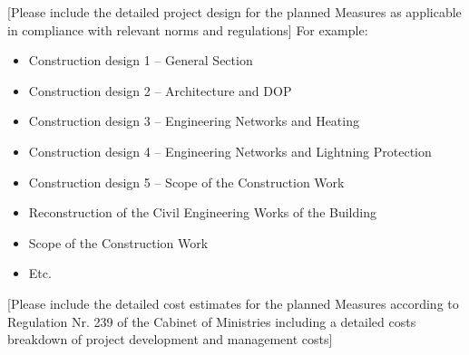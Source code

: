 [Please include the detailed project design for the planned Measures as applicable in compliance with relevant norms and regulations]
For example:

\begin{itemize}
	\item Construction design 1 – General Section
	\item Construction design 2 – Architecture and DOP
	\item Construction design 3 – Engineering Networks and Heating
	\item Construction design 4 – Engineering Networks and Lightning Protection
	\item Construction design 5 – Scope of the Construction Work
	\item Reconstruction of the Civil Engineering Works of the Building
	\item Scope of the Construction Work
	\item Etc.
\end{itemize}

[Please include the detailed cost estimates for the planned Measures according to Regulation Nr. 239 of the Cabinet of Ministries including a detailed costs breakdown of project development and management costs]
